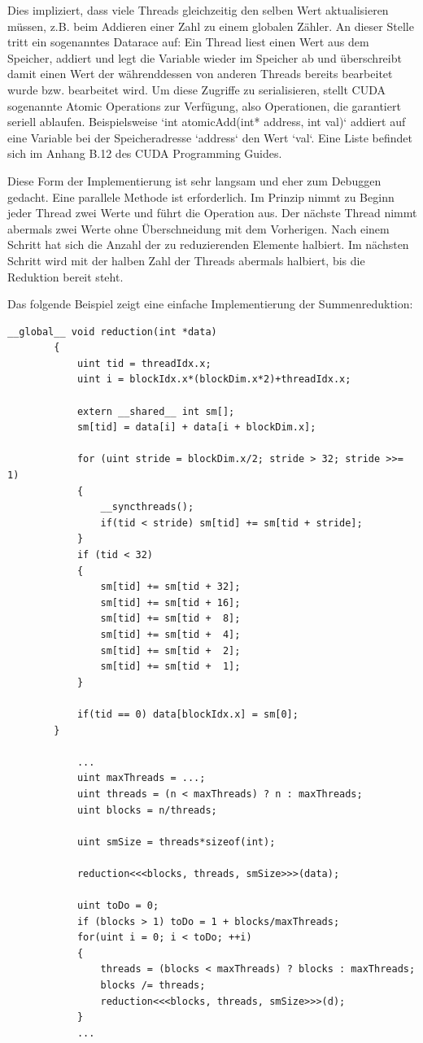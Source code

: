 		Dies impliziert, dass viele \Glspl{Thread} gleichzeitig den selben Wert aktualisieren müssen, z.B. beim Addieren einer Zahl zu einem globalen Zähler. An dieser Stelle tritt ein sogenanntes Datarace auf: Ein \Gls{Thread} liest einen Wert aus dem Speicher, addiert und legt die Variable wieder im Speicher ab und überschreibt damit einen Wert der währenddessen von anderen \Glspl{Thread} bereits bearbeitet wurde bzw. bearbeitet wird. Um diese Zugriffe zu serialisieren, stellt CUDA sogenannte Atomic Operations zur Verfügung, also Operationen, die garantiert seriell ablaufen. Beispielsweise \li`int atomicAdd(int* address, int val)` addiert auf eine Variable bei der Speicheradresse \li`address` den Wert \li`val`. Eine Liste befindet sich im Anhang B.12 des CUDA Programming Guides. \autocite{cudaPG}
		
		Diese Form der Implementierung ist sehr langsam und eher zum Debuggen gedacht. Eine parallele Methode ist erforderlich. Im Prinzip nimmt zu Beginn jeder \Gls{Thread} zwei Werte und führt die Operation aus. Der nächste \Gls{Thread} nimmt abermals zwei Werte ohne Überschneidung mit dem Vorherigen. Nach einem Schritt hat sich die Anzahl der zu reduzierenden Elemente halbiert. Im nächsten Schritt wird mit der halben Zahl der \Glspl{Thread} abermals halbiert, bis die Reduktion bereit steht.
		
		Das folgende Beispiel zeigt eine einfache Implementierung der Summenreduktion:
		
		\begin{lstlisting}[caption=Reduktion]		
		__global__ void reduction(int *data)
		{
			uint tid = threadIdx.x;
			uint i = blockIdx.x*(blockDim.x*2)+threadIdx.x;

			extern __shared__ int sm[]; 
			sm[tid] = data[i] + data[i + blockDim.x];
  
			for (uint stride = blockDim.x/2; stride > 32; stride >>= 1)
			{
				__syncthreads();
				if(tid < stride) sm[tid] += sm[tid + stride];
			}
			if (tid < 32)
  			{
				sm[tid] += sm[tid + 32];
				sm[tid] += sm[tid + 16];
				sm[tid] += sm[tid +  8];
				sm[tid] += sm[tid +  4];
				sm[tid] += sm[tid +  2];
				sm[tid] += sm[tid +  1];
			}
  
			if(tid == 0) data[blockIdx.x] = sm[0];
		}
		
			...
			uint maxThreads = ...;
			uint threads = (n < maxThreads) ? n : maxThreads;
			uint blocks = n/threads;

			uint smSize = threads*sizeof(int);

			reduction<<<blocks, threads, smSize>>>(data);  

			uint toDo = 0;
			if (blocks > 1) toDo = 1 + blocks/maxThreads;
			for(uint i = 0; i < toDo; ++i)
			{
				threads = (blocks < maxThreads) ? blocks : maxThreads;
				blocks /= threads;
				reduction<<<blocks, threads, smSize>>>(d);
			}
			...
		\end{lstlisting}
		
